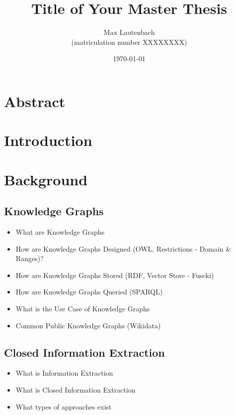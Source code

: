 \documentclass[a4paper,oneside,bibliography=totoc]{scrbook}
\begin{document}
\frontmatter
\subject{Master Thesis}
\title{Title of Your Master Thesis}
\author{Max Lautenbach\\
  (matriculation number XXXXXXXX)}
\date{\today}
\publishers{{\small Submitted to}\\
  Data and Web Science Group\\
  Prof.\ Dr.\ Right-Name-Here\\
  University of Mannheim\\}
\maketitle

\chapter{Abstract}


\begingroup%
\hypersetup{hidelinks}%
\tableofcontents%
\endgroup

\mainmatter

\chapter{Introduction}
\label{ch:intro}


\chapter{Background}
\label{ch:related_work}
\section{Knowledge Graphs}
\begin{itemize}
  \item What are Knowledge Graphs
  \item How are Knowledge Graphs Designed (OWL, Restrictions - Domain \& Ranges)?
  \item How are Knowledge Graphs Stored (RDF, Vector Store - Fuseki)
  \item How are Knowledge Graphs Queried (SPARQL)
  \item What is the Use Case of Knowledge Graphs
  \item Common Public Knowledge Graphs (Wikidata)
\end{itemize}
\section{Closed Information Extraction}
\begin{itemize}
  \item What is Information Extraction
  \item What is Closed Information Extraction
  \item What types of approaches exist
\end{itemize}
\end{document}
